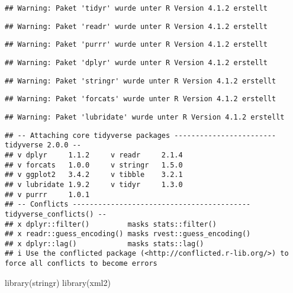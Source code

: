 \documentclass[
]{article}
\newenvironment{Shaded}{\begin{snugshade}}{\end{snugshade}}
\newcommand{\FunctionTok}[1]{\textcolor[rgb]{0.00,0.00,0.00}{#1}}
\newcommand{\NormalTok}[1]{#1}
\begin{document}
\begin{verbatim}
## Warning: Paket 'tidyr' wurde unter R Version 4.1.2 erstellt
\end{verbatim}

\begin{verbatim}
## Warning: Paket 'readr' wurde unter R Version 4.1.2 erstellt
\end{verbatim}

\begin{verbatim}
## Warning: Paket 'purrr' wurde unter R Version 4.1.2 erstellt
\end{verbatim}

\begin{verbatim}
## Warning: Paket 'dplyr' wurde unter R Version 4.1.2 erstellt
\end{verbatim}

\begin{verbatim}
## Warning: Paket 'stringr' wurde unter R Version 4.1.2 erstellt
\end{verbatim}

\begin{verbatim}
## Warning: Paket 'forcats' wurde unter R Version 4.1.2 erstellt
\end{verbatim}

\begin{verbatim}
## Warning: Paket 'lubridate' wurde unter R Version 4.1.2 erstellt
\end{verbatim}

\begin{verbatim}
## -- Attaching core tidyverse packages ------------------------ tidyverse 2.0.0 --
## v dplyr     1.1.2     v readr     2.1.4
## v forcats   1.0.0     v stringr   1.5.0
## v ggplot2   3.4.2     v tibble    3.2.1
## v lubridate 1.9.2     v tidyr     1.3.0
## v purrr     1.0.1     
## -- Conflicts ------------------------------------------ tidyverse_conflicts() --
## x dplyr::filter()         masks stats::filter()
## x readr::guess_encoding() masks rvest::guess_encoding()
## x dplyr::lag()            masks stats::lag()
## i Use the conflicted package (<http://conflicted.r-lib.org/>) to force all conflicts to become errors
\end{verbatim}

\begin{Shaded}
\begin{Highlighting}[]
\FunctionTok{library}\NormalTok{(stringr)}
\FunctionTok{library}\NormalTok{(xml2)}
\end{Highlighting}
\end{Shaded}
\end{document}
